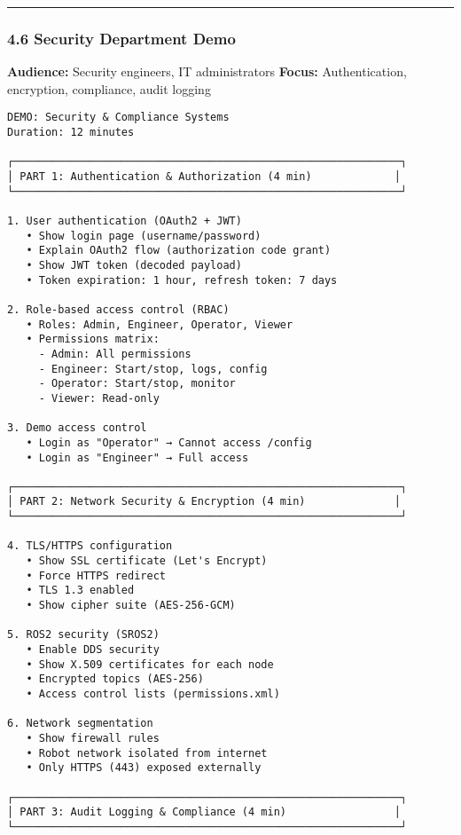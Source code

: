 \documentclass[
]{article}
\begin{document}
\begin{center}\rule{0.5\linewidth}{0.5pt}\end{center}

\hypertarget{security-department-demo}{%
\subsubsection{4.6 Security Department
Demo}\label{security-department-demo}}

\textbf{Audience:} Security engineers, IT administrators \textbf{Focus:}
Authentication, encryption, compliance, audit logging

\begin{verbatim}
DEMO: Security & Compliance Systems
Duration: 12 minutes

┌─────────────────────────────────────────────────────────────┐
│ PART 1: Authentication & Authorization (4 min)             │
└─────────────────────────────────────────────────────────────┘

1. User authentication (OAuth2 + JWT)
   • Show login page (username/password)
   • Explain OAuth2 flow (authorization code grant)
   • Show JWT token (decoded payload)
   • Token expiration: 1 hour, refresh token: 7 days

2. Role-based access control (RBAC)
   • Roles: Admin, Engineer, Operator, Viewer
   • Permissions matrix:
     - Admin: All permissions
     - Engineer: Start/stop, logs, config
     - Operator: Start/stop, monitor
     - Viewer: Read-only

3. Demo access control
   • Login as "Operator" → Cannot access /config
   • Login as "Engineer" → Full access

┌─────────────────────────────────────────────────────────────┐
│ PART 2: Network Security & Encryption (4 min)              │
└─────────────────────────────────────────────────────────────┘

4. TLS/HTTPS configuration
   • Show SSL certificate (Let's Encrypt)
   • Force HTTPS redirect
   • TLS 1.3 enabled
   • Show cipher suite (AES-256-GCM)

5. ROS2 security (SROS2)
   • Enable DDS security
   • Show X.509 certificates for each node
   • Encrypted topics (AES-256)
   • Access control lists (permissions.xml)

6. Network segmentation
   • Show firewall rules
   • Robot network isolated from internet
   • Only HTTPS (443) exposed externally

┌─────────────────────────────────────────────────────────────┐
│ PART 3: Audit Logging & Compliance (4 min)                 │
└─────────────────────────────────────────────────────────────┘


\end{verbatim}
\end{document}
